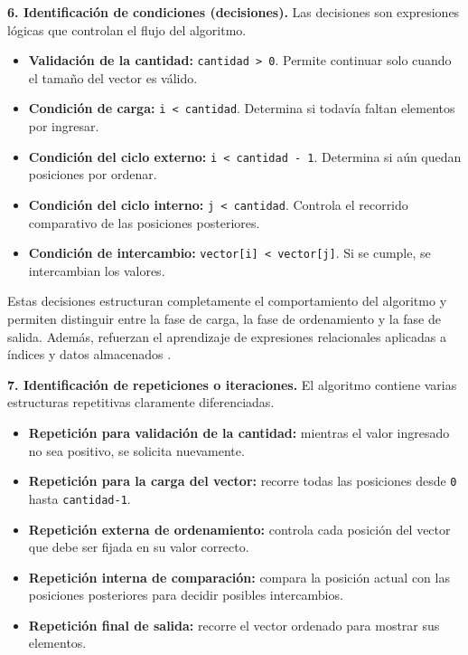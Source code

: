\documentclass[12pt,twoside]{book}
\begin{document}
						\noindent
						\textbf{6. Identificación de condiciones (decisiones).}
						Las decisiones son expresiones lógicas que controlan el flujo del algoritmo.
						
						\begin{itemize}
							\item \textbf{Validación de la cantidad:} \texttt{cantidad > 0}. Permite continuar solo cuando el tamaño del vector es válido.
							\item \textbf{Condición de carga:} \texttt{i < cantidad}. Determina si todavía faltan elementos por ingresar.
							\item \textbf{Condición del ciclo externo:} \texttt{i < cantidad - 1}. Determina si aún quedan posiciones por ordenar.
							\item \textbf{Condición del ciclo interno:} \texttt{j < cantidad}. Controla el recorrido comparativo de las posiciones posteriores.
							\item \textbf{Condición de intercambio:} \texttt{vector[i] < vector[j]}. Si se cumple, se intercambian los valores.
						\end{itemize}
						
						\noindent
						Estas decisiones estructuran completamente el comportamiento del algoritmo y permiten distinguir entre la fase de carga, la fase de ordenamiento y la fase de salida. Además, refuerzan el aprendizaje de expresiones relacionales aplicadas a índices y datos almacenados \cite{Sebesta2018Concepts,Farrell2018Programming}.
						
						\noindent
						\textbf{7. Identificación de repeticiones o iteraciones.}
						El algoritmo contiene varias estructuras repetitivas claramente diferenciadas.
						
						\begin{itemize}
							\item \textbf{Repetición para validación de la cantidad:} mientras el valor ingresado no sea positivo, se solicita nuevamente.
							\item \textbf{Repetición para la carga del vector:} recorre todas las posiciones desde \texttt{0} hasta \texttt{cantidad-1}.
							\item \textbf{Repetición externa de ordenamiento:} controla cada posición del vector que debe ser fijada en su valor correcto.
							\item \textbf{Repetición interna de comparación:} compara la posición actual con las posiciones posteriores para decidir posibles intercambios.
							\item \textbf{Repetición final de salida:} recorre el vector ordenado para mostrar sus elementos.
						\end{itemize}
						
\end{document}
